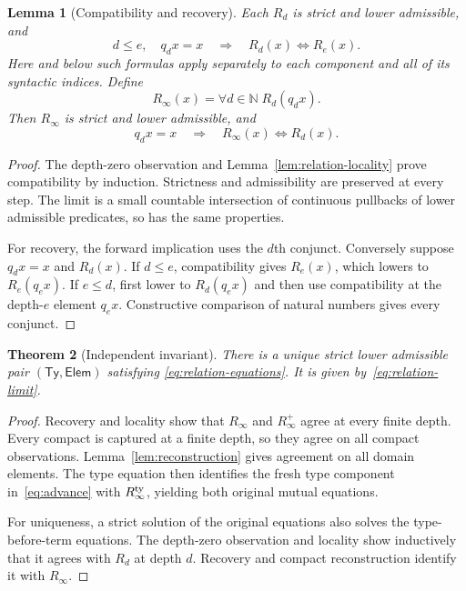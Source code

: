\documentclass[11pt,a4paper]{article}
\newtheorem{theorem}{Theorem}[section]
\newtheorem{lemma}[theorem]{Lemma}
\theoremstyle{definition}
\theoremstyle{remark}
\newcommand{\N}{\mathbb N}
\newcommand{\TyRel}{\mathsf{Ty}}
\newcommand{\ElemRel}{\mathsf{Elem}}
\begin{document}
\begin{lemma}[Compatibility and recovery]\label{lem:relation-recovery}
Each $R_d$ is strict and lower admissible, and
\[
 d\leq e,\quad q_dx=x
 \quad\Longrightarrow\quad R_d(x)\Longleftrightarrow R_e(x).
\]
Here and below such formulas apply separately to each component and
all of its syntactic indices. Define
\begin{equation}\label{eq:relation-limit}
 R_\infty(x)=\forall d\in\N\;R_d(q_dx).
\end{equation}
Then $R_\infty$ is strict and lower admissible, and
\[
 q_dx=x\quad\Longrightarrow\quad
 R_\infty(x)\Longleftrightarrow R_d(x).
\]
\end{lemma}
\begin{proof}
The depth-zero observation and Lemma~\ref{lem:relation-locality} prove
compatibility by induction. Strictness and admissibility are preserved
at every step. The limit is a small countable intersection of continuous
pullbacks of lower admissible predicates, so has the same properties.

For recovery, the forward implication uses the $d$th conjunct. Conversely
suppose $q_dx=x$ and $R_d(x)$. If $d\leq e$, compatibility gives $R_e(x)$,
which lowers to $R_e(q_ex)$. If $e\leq d$, first lower to $R_d(q_ex)$
and then use compatibility at the depth-$e$ element $q_ex$.
Constructive comparison of natural numbers gives every conjunct.
\end{proof}

\begin{theorem}[Independent invariant]\label{thm:independent-invariant}
There is a unique strict lower admissible pair $(\TyRel,\ElemRel)$ satisfying
\eqref{eq:relation-equations}. It is given by~\eqref{eq:relation-limit}.
\end{theorem}
\begin{proof}
Recovery and locality show that $R_\infty$ and $R_\infty^+$ agree at every
finite depth. Every compact is captured at a finite depth, so they agree
on all compact observations. Lemma~\ref{lem:reconstruction} gives agreement
on all domain elements. The type equation then identifies the fresh type
component in~\eqref{eq:advance} with $R_\infty^{\rm ty}$, yielding both
original mutual equations.

For uniqueness, a strict solution of the original equations also solves
the type-before-term equations. The depth-zero observation and locality
show inductively that it agrees with $R_d$ at depth $d$. Recovery and
compact reconstruction identify it with $R_\infty$.
\end{proof}
\end{document}
